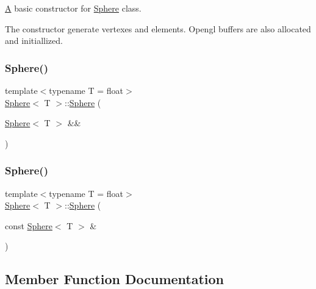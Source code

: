 \mbox{\hyperlink{classA}{A}} basic constructor for \mbox{\hyperlink{classSphere}{Sphere}} class. 

The constructor generate vertexes and elements. Opengl buffers are also allocated and initiallized. \mbox{\label{classSphere_af0d667b078ae88955113205112d9aaa6}} 
\subsubsection{\texorpdfstring{Sphere()}{Sphere()}\hspace{0.1cm}{\footnotesize\ttfamily [2/3]}}
{\footnotesize\ttfamily template$<$typename T  = float$>$ \\
\mbox{\hyperlink{classSphere}{Sphere}}$<$ T $>$\+::\mbox{\hyperlink{classSphere}{Sphere}} (\begin{DoxyParamCaption}\item[{\mbox{\hyperlink{classSphere}{Sphere}}$<$ T $>$ \&\&}]{ }\end{DoxyParamCaption})\hspace{0.3cm}{\ttfamily [default]}}

\mbox{\label{classSphere_ae28ad7649c59d653b9e14a3042d186a1}} 
\subsubsection{\texorpdfstring{Sphere()}{Sphere()}\hspace{0.1cm}{\footnotesize\ttfamily [3/3]}}
{\footnotesize\ttfamily template$<$typename T  = float$>$ \\
\mbox{\hyperlink{classSphere}{Sphere}}$<$ T $>$\+::\mbox{\hyperlink{classSphere}{Sphere}} (\begin{DoxyParamCaption}\item[{const \mbox{\hyperlink{classSphere}{Sphere}}$<$ T $>$ \&}]{ }\end{DoxyParamCaption})\hspace{0.3cm}{\ttfamily [default]}}



\subsection{Member Function Documentation}
\mbox{\label{classSphere_a9cfac85b9803fadc4b79db0ea047f679}} 
